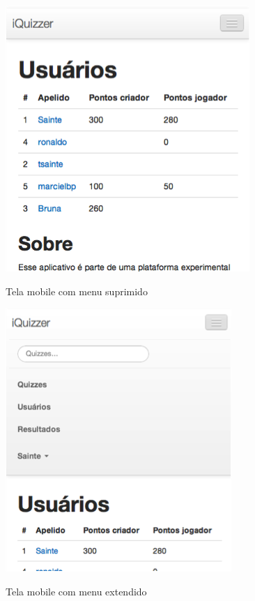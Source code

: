 	 \begin{figure}[H]
	   \centering
	   \includegraphics{figs/bootstraplayout2.png}\\
	   \caption{ Tela mobile com menu suprimido }
	   \label{FIG:bootstrapcontrol}
	 \end{figure}
	 \begin{figure}[H]
	   \centering
	   \includegraphics{figs/bootstraplayout3.png}\\
	   \caption{ Tela mobile com menu extendido }
	   \label{FIG:bootstrapcontrol}
	 \end{figure}

